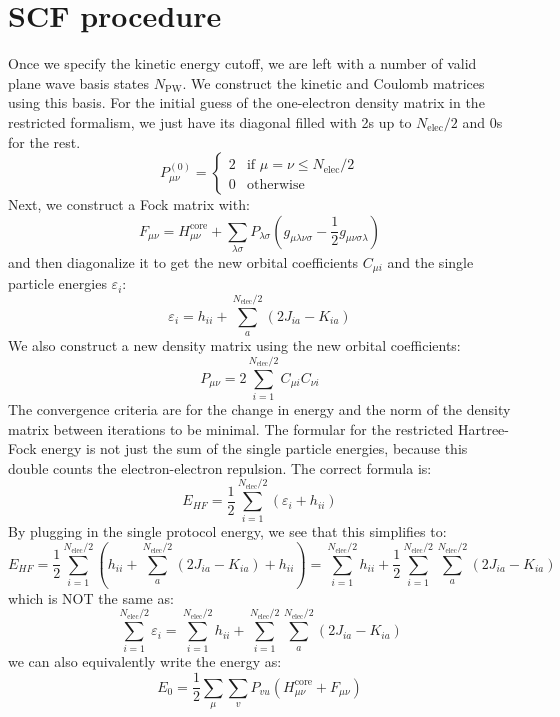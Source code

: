 \documentclass[12pt]{article}
\begin{document}
\section{SCF procedure}
Once we specify the kinetic energy cutoff, we are left with a number of valid plane wave basis states $N_{\text{PW}}$. We construct the kinetic and Coulomb matrices using this basis. For the initial guess of the one-electron density matrix in the restricted formalism, we just have its diagonal filled with 2s up to $N_\text{elec}/2$ and 0s for the rest.
\begin{equation}
    P^{(0)}_{\mu\nu} = \begin{cases}
    2 & \text{if } \mu = \nu \leq N_\text{elec}/2 \\
    0 & \text{otherwise}
    \end{cases}
\end{equation}
Next, we construct a Fock matrix with:
\begin{equation}
    F_{\mu\nu} = H_{\mu\nu}^{\text{core}} + \sum_{\lambda\sigma} P_{\lambda\sigma} \left(g_{\mu\lambda\nu\sigma} - \frac{1}{2}g_{\mu\nu\sigma\lambda}\right)
\end{equation}
and then diagonalize it to get the new orbital coefficients $C_{\mu i}$ and the single particle energies $\varepsilon_i$:
\begin{equation}
    \varepsilon_i = h_{ii} + \sum_{a}^{N_\text{elec}/2} \left(2J_{ia} - K_{ia}\right)
\end{equation}
 We also construct a new density matrix using the new orbital coefficients:
\begin{equation}
    P_{\mu\nu} = 2\sum_{i=1}^{N_\text{elec}/2} C_{\mu i} C_{\nu i}
\end{equation}
 The convergence criteria are for the change in energy and the norm of the density matrix between iterations to be minimal.
The formular for the restricted Hartree-Fock energy is not just the sum of the single particle energies, because this double counts the electron-electron repulsion. The correct formula is:
\begin{equation}
    E_{HF} = \frac{1}{2} \sum_{i=1}^{N_\text{elec}/2} \left(\varepsilon_i + h_{ii}\right)
\end{equation}
By plugging in the single protocol energy, we see that this simplifies to:
\begin{equation}
    E_{HF} = \frac{1}{2} \sum_{i=1}^{N_\text{elec}/2} \left(h_{ii} + \sum_{a}^{N_\text{elec}/2} \left(2J_{ia} - K_{ia}\right) + h_{ii}\right) = \sum_{i=1}^{N_\text{elec}/2} h_{ii} + \frac{1}{2} \sum_{i=1}^{N_\text{elec}/2} \sum_{a}^{N_\text{elec}/2} \left(2J_{ia} - K_{ia}\right)
\end{equation}
which is NOT the same as:
\begin{equation}
    \sum_{i=1}^{N_\text{elec}/2} \varepsilon_i = \sum_{i=1}^{N_\text{elec}/2} h_{ii} + \sum_{i=1}^{N_\text{elec}/2} \sum_{a}^{N_\text{elec}/2} \left(2J_{ia} - K_{ia}\right) 
\end{equation}
we can also equivalently write the energy as:
\begin{equation}
    E_0=\frac{1}{2} \sum_\mu \sum_v P_{v u}\left(H_{\mu \nu}^{\mathrm{core}}+F_{\mu \nu}\right)
\end{equation}
\end{document}
